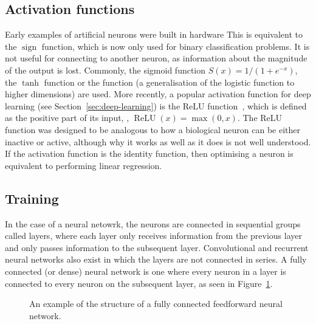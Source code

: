 \subsection{Activation functions} \label{sec:activation-functions}

Early examples of artificial neurons were built in hardware 
This is equivalent to the \(\operatorname{sign}\) function, which is now only used for binary classification problems.
It is not useful for connecting to another neuron, as information about the magnitude of the output is lost.
Commonly, the sigmoid function \(S(x) = 1/(1 + e^{-x})\), the \(\tanh\) function or the  function (a generalisation of the logistic function to higher dimensions) are used.
More recently, a popular activation function for deep learning (see Section~\ref{sec:deep-learning}) is the \ac{ReLU} function~\autocite{ramachandran2017}, which is defined as the positive part of its input, \ie{}, \(\operatorname{ReLU}(x) = \max(0, x)\).
The \ac{ReLU} function was designed to be analogous to how a biological neuron can be either inactive or active, although why it works as well as it does is not well understood.
If the activation function is the identity function, then optimising a neuron is equivalent to performing linear regression.

\subsection{Training} \label{sec:backpropagation}

In the case of a  neural netowrk, the neurons are connected in sequential groups called layers, where each layer only receives information from the previous layer and only passes information to the subsequent layer.
Convolutional and recurrent neural networks also exist in which the layers are not connected in series.
A fully connected (or dense) neural network is one where every neuron in a layer is connected to every neuron on the subsequent layer, as seen in Figure~\ref{fig:neural-network-example}.

\begin{figure}[htbp]
	\centering
	
	\caption{An example of the structure of a fully connected feedforward neural network.}
	\label{fig:neural-network-example}
\end{figure}

